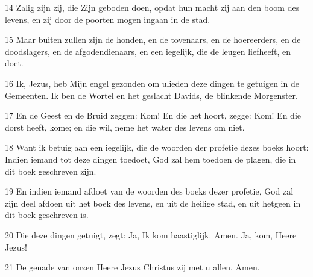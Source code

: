 \par 14 Zalig zijn zij, die Zijn geboden doen, opdat hun macht zij aan den boom des levens, en zij door de poorten mogen ingaan in de stad.
\par 15 Maar buiten zullen zijn de honden, en de tovenaars, en de hoereerders, en de doodslagers, en de afgodendienaars, en een iegelijk, die de leugen liefheeft, en doet.
\par 16 Ik, Jezus, heb Mijn engel gezonden om ulieden deze dingen te getuigen in de Gemeenten. Ik ben de Wortel en het geslacht Davids, de blinkende Morgenster.
\par 17 En de Geest en de Bruid zeggen: Kom! En die het hoort, zegge: Kom! En die dorst heeft, kome; en die wil, neme het water des levens om niet.
\par 18 Want ik betuig aan een iegelijk, die de woorden der profetie dezes boeks hoort: Indien iemand tot deze dingen toedoet, God zal hem toedoen de plagen, die in dit boek geschreven zijn.
\par 19 En indien iemand afdoet van de woorden des boeks dezer profetie, God zal zijn deel afdoen uit het boek des levens, en uit de heilige stad, en uit hetgeen in dit boek geschreven is.
\par 20 Die deze dingen getuigt, zegt: Ja, Ik kom haastiglijk. Amen. Ja, kom, Heere Jezus!
\par 21 De genade van onzen Heere Jezus Christus zij met u allen. Amen.





